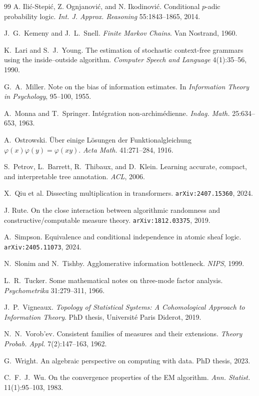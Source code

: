 \documentclass[11pt,a4paper]{article}
\theoremstyle{plain}
\theoremstyle{definition}
\begin{document}
\begin{thebibliography}{99}
 A. Ili\'c-Stepi\'c, Z. Ognjanovi\'c, and N. Ikodinovi\'c.
  Conditional $p$-adic probability logic. \emph{Int. J. Approx. Reasoning}
  55:1843--1865, 2014.

 J.~G.~Kemeny and J.~L.~Snell. \emph{Finite Markov Chains}.
  Van Nostrand, 1960.

 K.~Lari and S.~J.~Young. The estimation of stochastic
  context-free grammars using the inside--outside algorithm.
  \emph{Computer Speech and Language} 4(1):35--56, 1990.

 G.~A.~Miller. Note on the bias of information estimates.
  In \emph{Information Theory in Psychology}, 95--100, 1955.

 A.~Monna and T.~Springer. Int\'egration non-archim\'edienne.
  \emph{Indag. Math.} 25:634--653, 1963.

 A.~Ostrowski. \"Uber einige L\"osungen der
  Funktionalgleichung $\varphi(x)\varphi(y)=\varphi(xy)$.
  \emph{Acta Math.} 41:271--284, 1916.

 S.~Petrov, L.~Barrett, R.~Thibaux, and D.~Klein. Learning
  accurate, compact, and interpretable tree annotation. \emph{ACL}, 2006.

 X.~Qiu et al. Dissecting multiplication in transformers.
  \texttt{arXiv:2407.15360}, 2024.

 J. Rute. On the close interaction between algorithmic
  randomness and constructive/computable measure theory.
  \texttt{arXiv:1812.03375}, 2019.

 A.~Simpson. Equivalence and conditional independence in
  atomic sheaf logic. \texttt{arXiv:2405.11073}, 2024.

 N.~Slonim and N.~Tishby. Agglomerative information
  bottleneck. \emph{NIPS}, 1999.

 L.~R.~Tucker. Some mathematical notes on three-mode factor
  analysis. \emph{Psychometrika} 31:279--311, 1966.

 J.~P.~Vigneaux. \emph{Topology of Statistical Systems: A
  Cohomological Approach to Information Theory}. PhD thesis, Universit\'e Paris
  Diderot, 2019.

 N.~N.~Vorob'ev. Consistent families of measures and their
  extensions. \emph{Theory Probab. Appl.} 7(2):147--163, 1962.

 G.~Wright. An algebraic perspective on computing with
  data. PhD thesis, 2023.

 C.~F.~J.~Wu. On the convergence properties of the EM
  algorithm. \emph{Ann. Statist.} 11(1):95--103, 1983.

\end{thebibliography}
\end{document}
